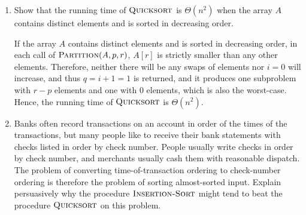 \documentclass[12pt,reqno]{amsart}
\newif\ifanswer
\begin{document}
\begin{enumerate}[1.]
\item Show that the running time of $\textsc{Quicksort}$ is $\Theta(n^2)$ when the array $A$ contains distinct elements and is sorted in decreasing order.

\ifanswer
{}
If the array $A$ contains distinct elements and is sorted in decreasing order, in each call of $\textsc{Partition}(A, p, r)$, $A[r]$ is strictly smaller than any other elements. Therefore, neither there will be any swaps of elements nor $i = 0$ will increase, and thus $q = i + 1 = 1$ is returned, and it produces one subproblem with $r - p$ elements and one with $0$ elements, which is also the worst-case. Hence, the running time of $\textsc{Quicksort}$ is $\Theta(n^2)$.
\vspace{1cm}



\item Banks often record transactions on an account in order of the times of the transactions, but many people like to receive their bank statements with checks listed in order by check number. People usually write checks in order by check number, and merchants usually cash them with reasonable dispatch. The problem of converting time-of-transaction ordering to check-number ordering is therefore the problem of sorting almost-sorted input. Explain persuasively why the procedure $\textsc{Insertion-Sort}$ might tend to beat the procedure $\textsc{Quicksort}$ on this problem.


\end{enumerate}
\end{document}
